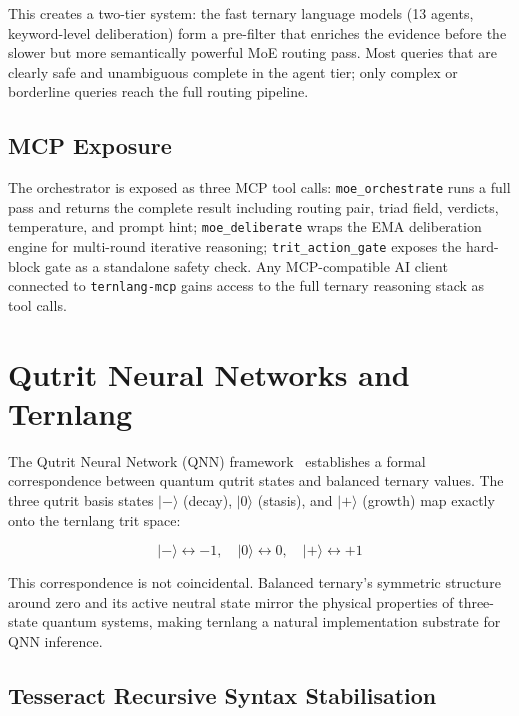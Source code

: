 \documentclass[journal,10pt,twocolumn]{IEEEtran}
\begin{document}
This creates a two-tier system: the fast ternary language models (13 agents,
keyword-level deliberation) form a pre-filter that enriches the evidence
before the slower but more semantically powerful MoE routing pass. Most
queries that are clearly safe and unambiguous complete in the agent tier;
only complex or borderline queries reach the full routing pipeline.

\subsection{MCP Exposure}

The orchestrator is exposed as three MCP tool calls:
\texttt{moe\_orchestrate} runs a full pass and returns the complete result
including routing pair, triad field, verdicts, temperature, and prompt hint;
\texttt{moe\_deliberate} wraps the EMA deliberation engine for multi-round
iterative reasoning; \texttt{trit\_action\_gate} exposes the hard-block gate
as a standalone safety check. Any MCP-compatible AI client connected to
\texttt{ternlang-mcp} gains access to the full ternary reasoning stack as
tool calls.

\section{Qutrit Neural Networks and Ternlang}
\label{sec:qnn}

The Qutrit Neural Network (QNN) framework~\cite{kepp2026qnn} establishes a
formal correspondence between quantum qutrit states and balanced ternary values.
The three qutrit basis states $\lvert -\rangle$ (decay), $\lvert 0\rangle$
(stasis), and $\lvert +\rangle$ (growth) map exactly onto the ternlang trit
space:

\begin{equation}
  \lvert -\rangle \leftrightarrow -1, \quad
  \lvert 0\rangle \leftrightarrow 0,  \quad
  \lvert +\rangle \leftrightarrow +1
  \label{eq:qnn_map}
\end{equation}

This correspondence is not coincidental. Balanced ternary's symmetric
structure around zero and its active neutral state mirror the physical
properties of three-state quantum systems, making ternlang a natural
implementation substrate for QNN inference.

\subsection{Tesseract Recursive Syntax Stabilisation}
\end{document}

